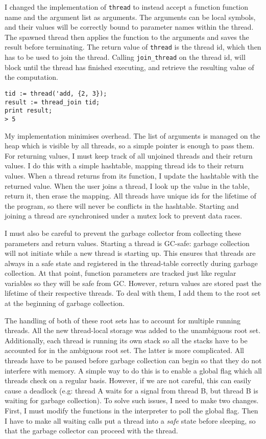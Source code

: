 I changed the implementation of \verb|thread| to instead accept a function function name and the argument list
as arguments. The arguments can be local symbols, and their values will be correctly bound to parameter names
within the thread. The spawned thread then applies the function to the arguments and saves the result
before terminating. The return value of \verb|thread| is the thread id, which then has to be used to
join the thread. Calling  \verb|join_thread| on the thread id, will block until the thread has finished
executing, and retrieve the resulting value of the computation.

\begin{verbatim}
tid := thread('add, {2, 3});
result := thread_join tid;
print result;
> 5
\end{verbatim}

My implementation minimises overhead. The list of arguments is managed on the heap which is visible by all
threads, so a simple pointer is enough to pass them. For returning values, I must keep track of all
unjoined threads and their return values. I do this with a simple hashtable, mapping thread ids to their
return values. When a thread returns from its function, I update the hashtable with the returned value.
When the user joins a thread, I look up the value in the table, return it, then erase the mapping. All threads
have unique ids for the lifetime of the program, so there will never be conflicts in the hashtable.
Starting and joining a thread are synchronised under a mutex lock to prevent data races.

I must also be careful to prevent the garbage collector from collecting these parameters and return values.
Starting a thread is GC-safe: garbage collection will not initiate while a new thread is starting up. This ensures
that threads are always in a safe state and registered in the thread-table correctly during garbage collection.
At that point, function parameters are tracked just like regular variables so they will be safe from GC.
However, return values are stored past the lifetime of their respective threads. To deal with them, I add them
to the root set at the beginning of garbage collection.

The handling of both of these root sets has to account for multiple running threads. All the new
thread-local storage was added to the unambiguous root set. Additionally, each thread is running its
own stack so all the stacks have to be accounted for in the ambiguous root set. The latter is more complicated.
All threads have to be paused before garbage collection can begin so that they do not interfere
with memory. A simple way to do this is to enable a global flag which all threads check on a regular basis.
However, if we are not careful, this can easily cause a deadlock (e.g: thread A waits for a signal from
thread B, but thread B is waiting for garbage collection). To solve such issues, I need to make two
changes. First, I must modify the functions in the interpreter to poll the global flag. Then I have
to make all waiting calls put a thread into a \emph{safe} state before sleeping, so that the garbage collector
can proceed with the thread.

